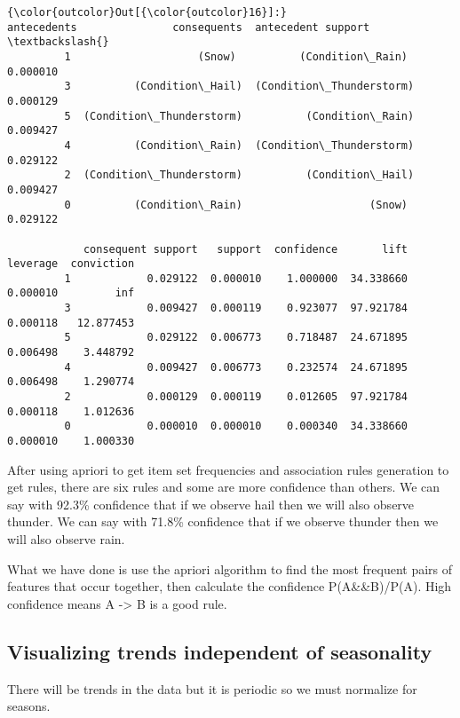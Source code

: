 \documentclass[11pt]{article}
\begin{document}
\begin{Verbatim}[commandchars=\\\{\}]
{\color{outcolor}Out[{\color{outcolor}16}]:}                 antecedents               consequents  antecedent support  \textbackslash{}
         1                    (Snow)          (Condition\_Rain)            0.000010   
         3          (Condition\_Hail)  (Condition\_Thunderstorm)            0.000129   
         5  (Condition\_Thunderstorm)          (Condition\_Rain)            0.009427   
         4          (Condition\_Rain)  (Condition\_Thunderstorm)            0.029122   
         2  (Condition\_Thunderstorm)          (Condition\_Hail)            0.009427   
         0          (Condition\_Rain)                    (Snow)            0.029122   
         
            consequent support   support  confidence       lift  leverage  conviction  
         1            0.029122  0.000010    1.000000  34.338660  0.000010         inf  
         3            0.009427  0.000119    0.923077  97.921784  0.000118   12.877453  
         5            0.029122  0.006773    0.718487  24.671895  0.006498    3.448792  
         4            0.009427  0.006773    0.232574  24.671895  0.006498    1.290774  
         2            0.000129  0.000119    0.012605  97.921784  0.000118    1.012636  
         0            0.000010  0.000010    0.000340  34.338660  0.000010    1.000330  
\end{Verbatim}
            
    After using apriori to get item set frequencies and association rules
generation to get rules, there are six rules and some are more
confidence than others. We can say with 92.3\% confidence that if we
observe hail then we will also observe thunder. We can say with 71.8\%
confidence that if we observe thunder then we will also observe rain.

    What we have done is use the apriori algorithm to find the most frequent
pairs of features that occur together, then calculate the confidence
P(A\&\&B)/P(A). High confidence means A -\textgreater{} B is a good
rule.

    \subsection{Visualizing trends independent of
seasonality}\label{visualizing-trends-independent-of-seasonality}

    There will be trends in the data but it is periodic so we must normalize
for seasons.
\end{document}
